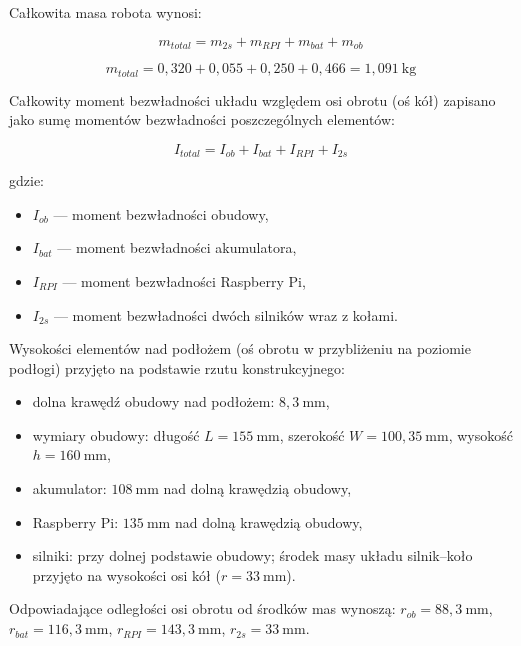 \documentclass[12pt,twoside]{article}
\begin{document}
Całkowita masa robota wynosi:

\begin{equation}
m_{total} = m_{2s} + m_{RPI} + m_{bat} + m_{ob}
\end{equation}

\begin{equation}
m_{total} = 0{,}320 + 0{,}055 + 0{,}250 + 0{,}466 = 1{,}091 \ \text{kg}
\end{equation}

Całkowity moment bezwładności układu względem osi obrotu (oś kół) zapisano jako sumę momentów bezwładności poszczególnych elementów:

\begin{equation}
I_{total}=I_{ob}+I_{bat}+I_{RPI}+I_{2s}
\label{eq:I_total}
\end{equation}

gdzie:

\begin{itemize}
    \item $I_{ob}$ --- moment bezwładności obudowy,
    \item $I_{bat}$ --- moment bezwładności akumulatora,
    \item $I_{RPI}$ --- moment bezwładności Raspberry Pi,
    \item $I_{2s}$ --- moment bezwładności dwóch silników wraz z kołami.
\end{itemize}

Wysokości elementów nad podłożem (oś obrotu w przybliżeniu na poziomie podłogi) przyjęto na podstawie rzutu konstrukcyjnego:

\begin{itemize}
    \item dolna krawędź obudowy nad podłożem: $8{,}3\ \mathrm{mm}$,
    \item wymiary obudowy: długość $L = 155\ \mathrm{mm}$, szerokość $W = 100{,}35\ \mathrm{mm}$, wysokość $h = 160\ \mathrm{mm}$,
    \item akumulator: $108\ \mathrm{mm}$ nad dolną krawędzią obudowy,
    \item Raspberry Pi: $135\ \mathrm{mm}$ nad dolną krawędzią obudowy,
    \item silniki: przy dolnej podstawie obudowy; środek masy układu silnik--koło przyjęto na wysokości osi kół ($r = 33\ \mathrm{mm}$).
\end{itemize}

Odpowiadające odległości osi obrotu od środków mas wynoszą:
$r_{ob} = 88{,}3\ \mathrm{mm}$, $r_{bat} = 116{,}3\ \mathrm{mm}$, $r_{RPI} = 143{,}3\ \mathrm{mm}$, $r_{2s} = 33\ \mathrm{mm}$.
\end{document}
